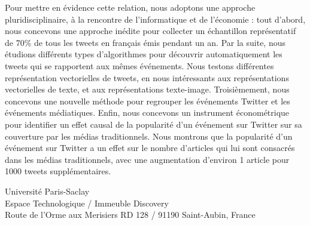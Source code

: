 \begin{singlespace}
\begin{mdframed}[linecolor=Prune,linewidth=1]
\begin{multicols}{2}
Pour mettre en évidence cette relation, nous adoptons une approche pluridisciplinaire, à la rencontre de l'informatique et de l'économie : tout d’abord, nous concevons une approche inédite pour collecter un échantillon représentatif de 70\% de tous les tweets en français émis pendant un an. Par la suite, nous étudions différents types d'algorithmes pour découvrir automatiquement les tweets qui se rapportent aux mêmes événements. Nous testons différentes représentation vectorielles de tweets, en nous intéressants aux représentations vectorielles de texte, et aux représentations texte-image.  Troisièmement, nous concevons une nouvelle méthode pour regrouper les événements Twitter et les événements médiatiques. Enfin, nous concevons un instrument économétrique pour identifier un effet causal de la popularité d'un événement sur Twitter sur sa couverture par les médias traditionnels. Nous montrons que la popularité d’un événement sur Twitter a un effet sur le nombre d'articles qui lui sont consacrés dans les médias traditionnels, avec une augmentation d'environ 1 article pour 1000 tweets supplémentaires.
\end{multicols}
\smallskip
\end{mdframed}

\vspace*{.5cm} %

\selectfont
{\color{Prune} \noindent Université Paris-Saclay\\
Espace Technologique / Immeuble Discovery\\
Route de l’Orme aux Merisiers RD 128 / 91190 Saint-Aubin, France} %
\end{singlespace}